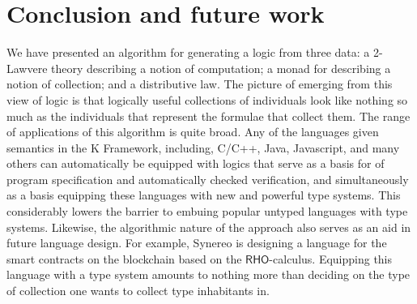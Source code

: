 \documentclass{llncs}
\begin{document}
\section{Conclusion and future work}
We have presented an algorithm for generating a logic from three data:
a 2-Lawvere theory describing a notion of computation; a monad for
describing a notion of collection; and a distributive law. The picture
of emerging from this view of logic is that logically useful
collections of individuals look like nothing so much as the
individuals that represent the formulae that collect them. The range
of applications of this algorithm is quite broad. Any of the languages
given semantics in the K Framework, including, C/C++, Java,
Javascript, and many others can automatically be equipped with logics
that serve as a basis for of program specification and automatically
checked verification, and simultaneously as a basis equipping these
languages with new and powerful type systems. This considerably lowers
the barrier to embuing popular untyped languages with type
systems. Likewise, the algorithmic nature of the approach also serves as an aid
in future language design. For example, Synereo is designing a
language for the smart contracts on the blockchain based on the
$\mathsf{RHO}$-calculus. Equipping this language with a type system
amounts to nothing more than deciding on the type of collection one
wants to collect type inhabitants in.



\end{document}
